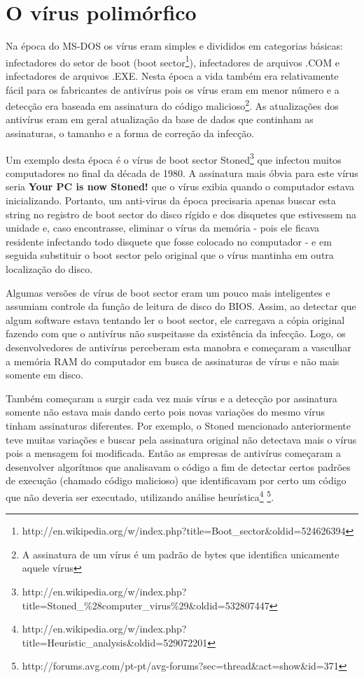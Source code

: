 \chapter{O vírus polimórfico}

Na época do MS-DOS os vírus eram simples e divididos em categorias básicas: infectadores do setor de boot (boot sector\footnote{http://en.wikipedia.org/w/index.php?title=Boot\_sector\&oldid=524626394}), infectadores de arquivos .COM e infectadores de arquivos .EXE. Nesta época a vida também era relativamente fácil para os fabricantes de antivírus pois os vírus eram em menor número e a detecção era baseada em assinatura do código malicioso\footnote{A assinatura de um vírus é um padrão de bytes que identifica unicamente aquele vírus}. As atualizações dos antivírus eram em geral atualização da base de dados que continham as assinaturas, o tamanho e a forma de correção da infecção.

Um exemplo desta época é o vírus de boot sector Stoned\footnote{http://en.wikipedia.org/w/index.php?title=Stoned\_\%28computer\_virus\%29\&oldid=532807447} que infectou muitos computadores no final da década de 1980. A assinatura mais óbvia para este vírus seria \textbf{Your PC is now Stoned!} que o vírus exibia quando o computador estava inicializando. Portanto, um anti-virus da época precisaria apenas buscar esta string no registro de boot sector do disco rígido e dos disquetes que estivessem na unidade e, caso encontrasse, eliminar o vírus da memória - pois ele ficava residente infectando todo disquete que fosse colocado no computador - e em seguida substituir o boot sector pelo original que o vírus mantinha em outra localização do disco.

Algumas versões de vírus de boot sector eram um pouco mais inteligentes e assumiam controle da função de leitura de disco do BIOS. Assim, ao detectar que algum software estava tentando ler o boot sector, ele carregava a cópia original fazendo com que o antivírus não suspeitasse da existência da infecção. Logo, os desenvolvedores de antivírus perceberam esta manobra e começaram a vasculhar a memória RAM do computador em busca de assinaturas de vírus e não mais somente em disco.

Também começaram a surgir cada vez mais vírus e a detecção por assinatura somente não estava mais dando certo pois novas variações do mesmo vírus tinham assinaturas diferentes. Por exemplo, o Stoned mencionado anteriormente teve muitas variações e buscar pela assinatura original não detectava mais o vírus pois a mensagem foi modificada. Então as empresas de antivírus começaram a desenvolver algorítmos que analisavam o código a fim de detectar certos padrões de execução (chamado código malicioso) que identificavam por certo um código que não deveria ser executado, utilizando análise heurística\footnote{http://en.wikipedia.org/w/index.php?title=Heuristic\_analysis\&oldid=529072201} \footnote{http://forums.avg.com/pt-pt/avg-forums?sec=thread\&act=show\&id=371}.

